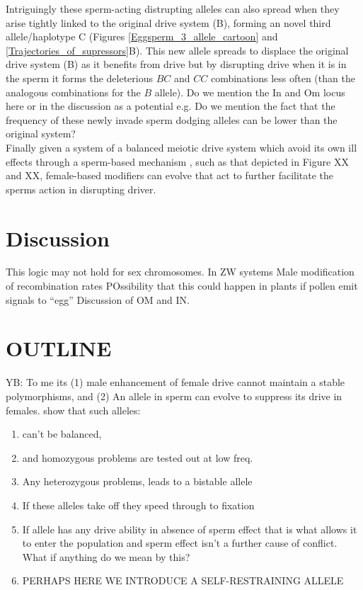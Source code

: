 \documentclass[12pt,letterpaper]{article}
\newcommand{\gc}[1]{{ \color{red} #1}}
\newcommand{\yb}[1]{{ \color{blue} #1}}
\begin{document}
Intriguingly these sperm-acting distrupting alleles can also spread
when they arise tightly linked to the original drive system (B), forming
an novel third allele/haplotype C (Figures \ref{Eggsperm_3_allele_cartoon} and \ref{Trajectories_of_supressors}B). This new allele spreads
to displace the original drive system (B) as it benefits from drive
but by disrupting drive when it is in the sperm it forms
 the deleterious $BC$ and $CC$ combinations less often (than the
 analogous combinations for the $B$ allele). 
\gc{Do we mention the In and Om locus here or in the discussion as a
  potential e.g. Do we mention the fact that the frequency of these
  newly invade sperm dodging alleles can be lower than the original system?}\\

Finally given a system of a balanced meiotic drive system which avoid
its own ill effects through a sperm-based mechanism
, such as that depicted in Figure XX and XX, female-based modifiers 
can evolve that act to further facilitate the sperms action in
disrupting driver.

\section*{Discussion}


This logic may not hold for sex chromosomes. In ZW systems 
 Male modification of recombination rates
POssibility that this could happen in plants if pollen emit signals to ``egg''
Discussion of OM and IN.


\section*{OUTLINE}
\yb{YB: To me its (1) male enhancement of female drive cannot maintain a stable polymorphisms, and (2) An allele in sperm can evolve to suppress its drive in females.}
show that such alleles:
\begin{enumerate}
\item can't be balanced, \\
\item and homozygous problems are tested out at low freq.  \\
\item Any heterozygous problems, leads to a bistable allele\\
\item If these alleles take off they speed through to fixation\\
\item If allele has any drive ability in absence of sperm effect that is what allows it to enter the population
and sperm effect isn't a further cause of conflict. What if anything do we mean by this?\\
\item PERHAPS HERE WE INTRODUCE A SELF-RESTRAINING ALLELE
\end{enumerate}
\end{document}
